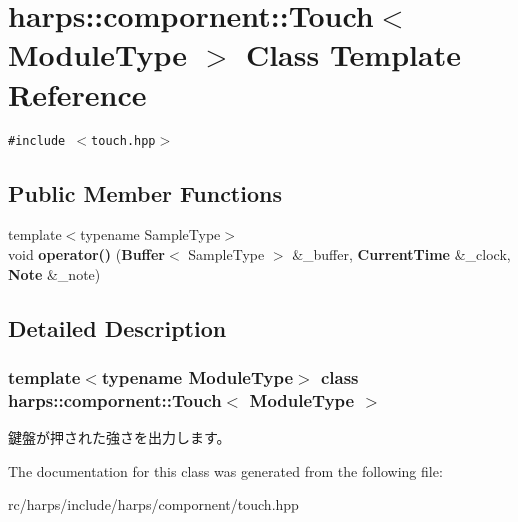 \section{harps::compornent::Touch$<$ ModuleType $>$ Class Template Reference}
\label{classharps_1_1compornent_1_1Touch}
{\tt \#include $<$touch.hpp$>$}

\subsection*{Public Member Functions}
\begin{CompactItemize}
\item 
{\footnotesize template$<$typename SampleType$>$ }\\void \textbf{operator()} ({\bf Buffer}$<$ SampleType $>$ \&\_\-buffer, {\bf CurrentTime} \&\_\-clock, {\bf Note} \&\_\-note)\label{classharps_1_1compornent_1_1Touch_706224afa2eecdfd994668640d5609c7}

\end{CompactItemize}


\subsection{Detailed Description}
\subsubsection*{template$<$typename ModuleType$>$ class harps::compornent::Touch$<$ ModuleType $>$}

鍵盤が押された強さを出力します。 

The documentation for this class was generated from the following file:\begin{CompactItemize}
\item 
rc/harps/include/harps/compornent/touch.hpp\end{CompactItemize}
